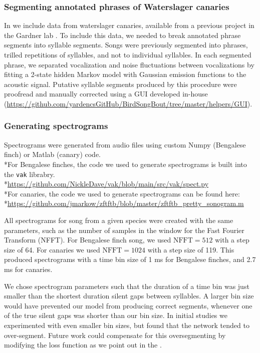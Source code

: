 \documentclass[9pt,lineno]{elife}
\begin{document}
\subsubsection{Segmenting annotated phrases of Waterslager canaries}
In  we include data from waterslager canaries, 
available from a previous project in the Gardner lab \citep{markowitz_long-range_2013}.
To include this data, we needed to break annotated phrase segments into syllable segments.
Songs were previously segmented into phrases, trilled repetitions of syllables, and not to individual syllables.  In each segmented phrase, we separated vocalization and noise fluctuations between vocalizations by fitting a 2-state hidden Markov model with Gaussian emission functions to the acoustic signal. Putative syllable segments produced by this procedure were proofread and manually corrected using a GUI developed in-house  (\url{https://github.com/yardencsGitHub/BirdSongBout/tree/master/helpers/GUI}).

\subsubsection{Generating spectrograms}
Spectrograms were generated from audio files 
using custom Numpy (Bengalese finch) or Matlab (canary) code. 
\\*For Bengalese finches, the code we used to generate spectrograms 
is built into the \texttt{vak} librabry.
\\*\url{https://github.com/NickleDave/vak/blob/main/src/vak/spect.py}
\\*For canaries, the code we used to generate spectrograms can be found here:
\\*\url{https://github.com/jmarkow/zftftb/blob/master/zftftb_pretty_sonogram.m}

All spectrograms for song from a given species 
were created with the same parameters, such as the number of 
samples in the window for the Fast Fourier Transform (NFFT). 
For Bengalese finch song, we used $\text{NFFT}=512$ with a step size of 64. 
For canaries we used $\text{NFFT}=1024$ with a step size of 119.
This produced spectrograms with a time bin size of 1 ms for Bengalese finches, 
and 2.7 ms for canaries.

We chose spectrogram parameters such that the duration of a time bin 
was just smaller than the shortest duration silent gaps between syllables.
A larger bin size would have prevented our model from producing correct segments, 
whenever one of the true silent gaps was shorter than our bin size. 
In initial studies we experimented with even smaller bin sizes, 
but found that the network tended to over-segment. 
Future work could compensate for this oversegmenting by modifying the loss function 
as we point out in the .
\end{document}
